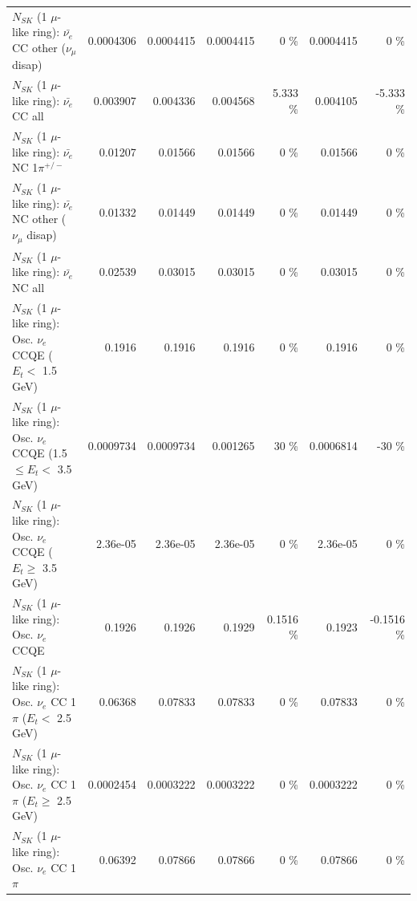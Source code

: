 \begin{table}
\begin{tabular}{| l | r | r | r  r | r  r |}
          $N_{SK}$ (1 $\mu$-like ring): $\bar{\nu_e}$ CC other ($\nu_\mu$ disap) &       0.0004306 &       0.0004415 &       0.0004415 &        0 \%  &       0.0004415 &        0 \%  \\ 
                            $N_{SK}$ (1 $\mu$-like ring): $\bar{\nu_{e}}$ CC all &        0.003907 &        0.004336 &        0.004568 &    5.333 \%  &        0.004105 &   -5.333 \%  \\ 
\hline
                     $N_{SK}$ (1 $\mu$-like ring): $\bar{\nu_e}$ NC 1$\pi^{+/-}$ &         0.01207 &         0.01566 &         0.01566 &        0 \%  &         0.01566 &        0 \%  \\ 
          $N_{SK}$ (1 $\mu$-like ring): $\bar{\nu_e}$ NC other ($\nu_\mu$ disap) &         0.01332 &         0.01449 &         0.01449 &        0 \%  &         0.01449 &        0 \%  \\ 
                            $N_{SK}$ (1 $\mu$-like ring): $\bar{\nu_{e}}$ NC all &         0.02539 &         0.03015 &         0.03015 &        0 \%  &         0.03015 &        0 \%  \\ 
\hline
\hline
\hline
             $N_{SK}$ (1 $\mu$-like ring): Osc. $\nu_e$ CCQE ($E_{t} <$ 1.5 GeV) &          0.1916 &          0.1916 &          0.1916 &        0 \%  &          0.1916 &        0 \%  \\ 
    $N_{SK}$ (1 $\mu$-like ring): Osc. $\nu_e$ CCQE (1.5 $\leq E_{t} <$ 3.5 GeV) &       0.0009734 &       0.0009734 &        0.001265 &       30 \%  &       0.0006814 &      -30 \%  \\ 
          $N_{SK}$ (1 $\mu$-like ring): Osc. $\nu_e$ CCQE ($E_{t} \geq$ 3.5 GeV) &        2.36e-05 &        2.36e-05 &        2.36e-05 &        0 \%  &        2.36e-05 &        0 \%  \\ 
\hline
                                 $N_{SK}$ (1 $\mu$-like ring): Osc. $\nu_e$ CCQE &          0.1926 &          0.1926 &          0.1929 &   0.1516 \%  &          0.1923 &  -0.1516 \%  \\ 
\hline
        $N_{SK}$ (1 $\mu$-like ring): Osc. $\nu_e$ CC 1$\pi$ ($E_{t} <$ 2.5 GeV) &         0.06368 &         0.07833 &         0.07833 &        0 \%  &         0.07833 &        0 \%  \\ 
     $N_{SK}$ (1 $\mu$-like ring): Osc. $\nu_e$ CC 1$\pi$ ($E_{t} \geq$ 2.5 GeV) &       0.0002454 &       0.0003222 &       0.0003222 &        0 \%  &       0.0003222 &        0 \%  \\ 
\hline
                            $N_{SK}$ (1 $\mu$-like ring): Osc. $\nu_e$ CC 1$\pi$ &         0.06392 &         0.07866 &         0.07866 &        0 \%  &         0.07866 &        0 \%  \\ 

\end{tabular}
\end{table}
